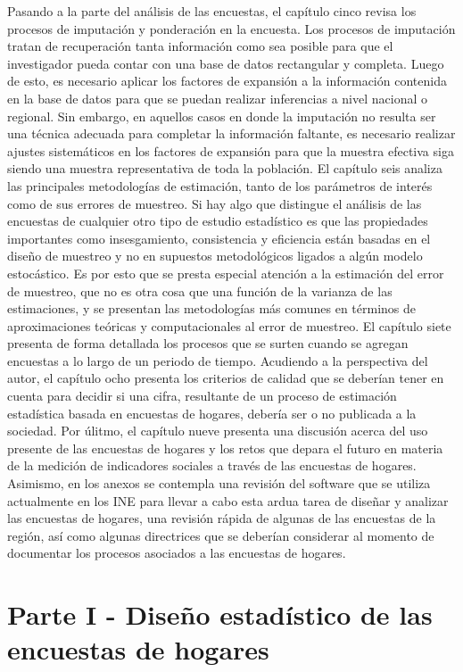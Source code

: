 \documentclass[
  12pt,
  spanish,
]{book}
\begin{document}
Pasando a la parte del análisis de las encuestas, el capítulo cinco revisa los procesos de imputación y ponderación en la encuesta. Los procesos de imputación tratan de recuperación tanta información como sea posible para que el investigador pueda contar con una base de datos rectangular y completa. Luego de esto, es necesario aplicar los factores de expansión a la información contenida en la base de datos para que se puedan realizar inferencias a nivel nacional o regional. Sin embargo, en aquellos casos en donde la imputación no resulta ser una técnica adecuada para completar la información faltante, es necesario realizar ajustes sistemáticos en los factores de expansión para que la muestra efectiva siga siendo una muestra representativa de toda la población. El capítulo seis analiza las principales metodologías de estimación, tanto de los parámetros de interés como de sus errores de muestreo. Si hay algo que distingue el análisis de las encuestas de cualquier otro tipo de estudio estadístico es que las propiedades importantes como insesgamiento, consistencia y eficiencia están basadas en el diseño de muestreo y no en supuestos metodológicos ligados a algún modelo estocástico. Es por esto que se presta especial atención a la estimación del error de muestreo, que no es otra cosa que una función de la varianza de las estimaciones, y se presentan las metodologías más comunes en términos de aproximaciones teóricas y computacionales al error de muestreo. El capítulo siete presenta de forma detallada los procesos que se surten cuando se agregan encuestas a lo largo de un periodo de tiempo. Acudiendo a la perspectiva del autor, el capítulo ocho presenta los criterios de calidad que se deberían tener en cuenta para decidir si una cifra, resultante de un proceso de estimación estadística basada en encuestas de hogares, debería ser o no publicada a la sociedad. Por úlitmo, el capítulo nueve presenta una discusión acerca del uso presente de las encuestas de hogares y los retos que depara el futuro en materia de la medición de indicadores sociales a través de las encuestas de hogares. Asimismo, en los anexos se contempla una revisión del software que se utiliza actualmente en los INE para llevar a cabo esta ardua tarea de diseñar y analizar las encuestas de hogares, una revisión rápida de algunas de las encuestas de la región, así como algunas directrices que se deberían considerar al momento de documentar los procesos asociados a las encuestas de hogares.

\hypertarget{part-parte-i---diseuxf1o-estaduxedstico-de-las-encuestas-de-hogares}{%
\part{Parte I - Diseño estadístico de las encuestas de hogares}\label{part-parte-i---diseuxf1o-estaduxedstico-de-las-encuestas-de-hogares}}
\end{document}
